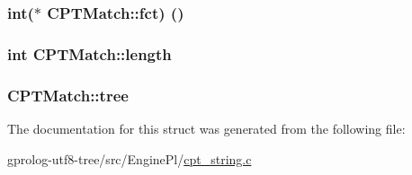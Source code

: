 \subsubsection[{\texorpdfstring{fct}{fct}}]{\setlength{\rightskip}{0pt plus 5cm}int($\ast$ C\+P\+T\+Match\+::fct) ()}\hypertarget{structCPTMatch_a1bee4a76898a1ef5809eb26af9d9673d}{}\label{structCPTMatch_a1bee4a76898a1ef5809eb26af9d9673d}
\subsubsection[{\texorpdfstring{length}{length}}]{\setlength{\rightskip}{0pt plus 5cm}int C\+P\+T\+Match\+::length}\hypertarget{structCPTMatch_aa6d88b8078ed95b080fd648bd46a67c9}{}\label{structCPTMatch_aa6d88b8078ed95b080fd648bd46a67c9}
\subsubsection[{\texorpdfstring{tree}{tree}}]{ C\+P\+T\+Match\+::tree}\hypertarget{structCPTMatch_a11fa53acc2fd955cbea152f381e82f31}{}\label{structCPTMatch_a11fa53acc2fd955cbea152f381e82f31}


The documentation for this struct was generated from the following file\+:\begin{DoxyCompactItemize}
\item 
gprolog-\/utf8-\/tree/src/\+Engine\+Pl/\hyperlink{cpt__string_8c}{cpt\+\_\+string.\+c}\end{DoxyCompactItemize}
